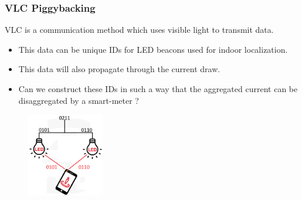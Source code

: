 \documentclass{beamer}
\begin{document}


	\begin{frame}\frametitle{VLC Piggybacking}

		VLC is a communication method which uses visible light to transmit data.

		\begin{itemize}

			\item This data can be unique IDs for LED beacons used for indoor localization.

			\item This data will also propagate through the current draw.

			\item Can we construct these IDs in such a way that the aggregated current can be disaggregated by a smart-meter ?

		\end{itemize}


		\begin{figure}
			\centering
			\includegraphics[width=0.3\textwidth]{vlc-indoor-positioning-edit.png}
		\end{figure}



	\end{frame}
\end{document}
